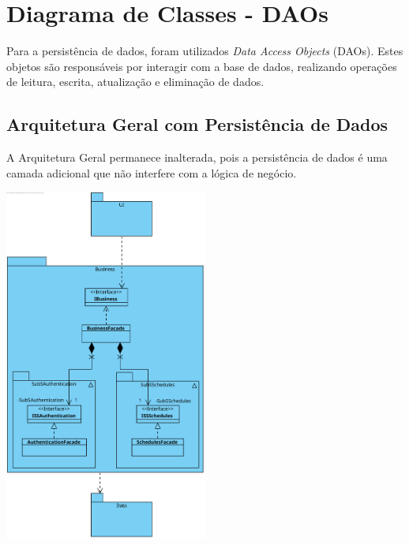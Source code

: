 \documentclass[a4paper,12pt]{scrreprt}
\begin{document}


\chapter{Diagrama de Classes - DAOs}

Para a persistência de dados, foram utilizados \textit{Data Access Objects} (DAOs).
Estes objetos são responsáveis por interagir com a base de dados, realizando operações
de leitura, escrita, atualização e eliminação de dados.

\section{Arquitetura Geral com Persistência de Dados}

A Arquitetura Geral permanece inalterada, pois a persistência de dados é uma camada
adicional que não interfere com a lógica de negócio.

\begin{minipage}{\textwidth}
    \centering
    \includegraphics[width=0.5\textwidth]{images/class-diagrams/1-arquitetura-geral.png}
    \label{fig:6-1-arquitetura_geral_com_persistencia_de_dados}
\end{minipage}
\end{document}
